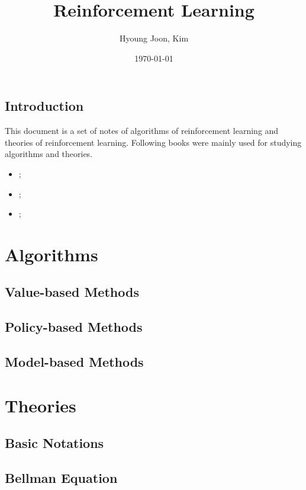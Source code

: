 \documentclass{report}
\title{Reinforcement Learning}
\author{Hyoung Joon, Kim}
\date{\today}
\begin{document}
\maketitle
\tableofcontents
\newpage
\chapter{Introduction}
        This document is a set of notes of algorithms of reinforcement learning and theories of reinforcement learning.
        Following books were mainly used for studying algorithms and theories.
        \begin{itemize}
            \item \cite{Sutton2020};
            \item \cite{Graesser2020};
            \item \cite{Zhao2025};
        \end{itemize}
\part{Algorithms}
    \chapter{Value-based Methods}
    \chapter{Policy-based Methods}
    
    \chapter{Model-based Methods}
\part{Theories}
    \chapter{Basic Notations}
    
    \chapter{Bellman Equation}
    
    

\printbibliography
\end{document}
